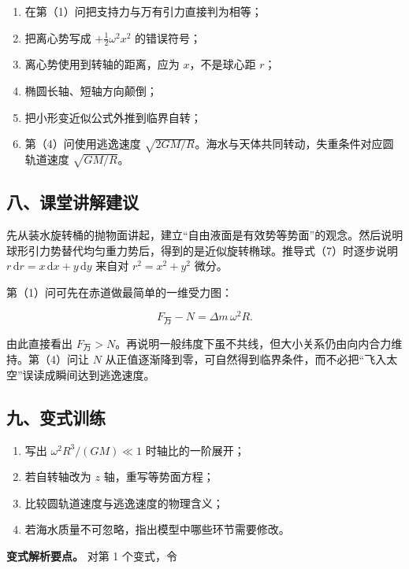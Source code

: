 \documentclass[12pt,a4paper,UTF8]{ctexart}
\newcommand{\tightlist}{\setlength{\itemsep}{0pt}\setlength{\parskip}{0pt}}
\begin{document}
\begin{enumerate}
\def\labelenumi{\arabic{enumi}.}
\tightlist
\item
  在第（1）问把支持力与万有引力直接判为相等；
\item
  把离心势写成 \(+\frac12\omega^2x^2\) 的错误符号；
\item
  离心势使用到转轴的距离，应为 \(x\)，不是球心距 \(r\)；
\item
  椭圆长轴、短轴方向颠倒；
\item
  把小形变近似公式外推到临界自转；
\item
  第（4）问使用逃逸速度
  \(\sqrt{2GM/R}\)。海水与天体共同转动，失重条件对应圆轨道速度
  \(\sqrt{GM/R}\)。
\end{enumerate}

\subsection{八、课堂讲解建议}\label{ux516bux8bfeux5802ux8bb2ux89e3ux5efaux8bae-5}

先从装水旋转桶的抛物面讲起，建立``自由液面是有效势等势面''的观念。然后说明球形引力势替代均匀重力势后，得到的是近似旋转椭球。推导式（7）时逐步说明
\(r\,\mathrm dr=x\,\mathrm dx+y\,\mathrm dy\) 来自对 \(r^2=x^2+y^2\)
微分。

第（1）问可先在赤道做最简单的一维受力图：

\[
F_{\text{万}}-N=\Delta m\,\omega^2R.
\]

由此直接看出
\(F_{\text{万}}>N\)。再说明一般纬度下虽不共线，但大小关系仍由向内合力维持。第（4）问让
\(N\)
从正值逐渐降到零，可自然得到临界条件，而不必把``飞入太空''误读成瞬间达到逃逸速度。

\subsection{九、变式训练}\label{ux4e5dux53d8ux5f0fux8badux7ec3-5}

\begin{enumerate}
\def\labelenumi{\arabic{enumi}.}
\tightlist
\item
  写出 \(\omega^2R^3/(GM)\ll1\) 时轴比的一阶展开；
\item
  若自转轴改为 \(z\) 轴，重写等势面方程；
\item
  比较圆轨道速度与逃逸速度的物理含义；
\item
  若海水质量不可忽略，指出模型中哪些环节需要修改。
\end{enumerate}

\textbf{变式解析要点。} 对第 1 个变式，令
\end{document}
